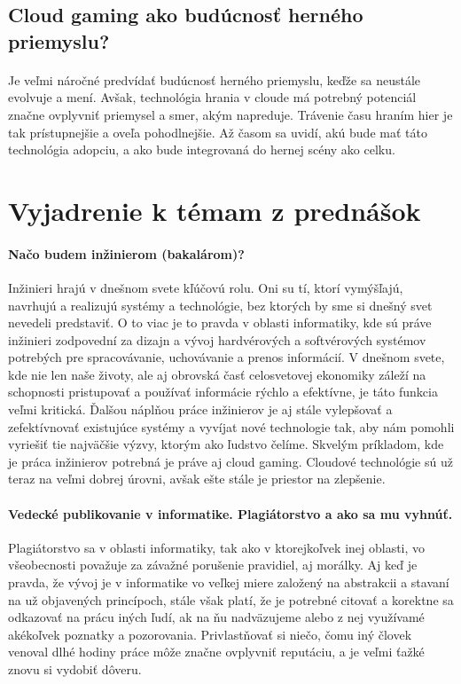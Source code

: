 \documentclass[10pt,twoside,slovak,a4paper]{article}
\begin{document}
\subsection{Cloud gaming ako budúcnosť herného priemyslu?}

\paragraph{} Je veľmi náročné predvídať budúcnosť herného priemyslu, keďže sa neustále evolvuje a mení. Avšak, technológia hrania v cloude má potrebný potenciál značne ovplyvniť priemysel a smer, akým napreduje. Trávenie času hraním hier je tak prístupnejšie a oveľa pohodlnejšie. Až časom sa uvidí, akú bude mať táto technológia adopciu, a ako bude integrovaná do hernej scény ako celku. \cite{7182690}



\section{Vyjadrenie k témam z prednášok}

\paragraph{Načo budem inžinierom (bakalárom)?} Inžinieri hrajú v dnešnom svete kľúčovú rolu. Oni su tí, ktorí vymýšľajú, navrhujú a realizujú systémy a technológie, bez ktorých by sme si dnešný svet nevedeli predstaviť. O to viac je to pravda v oblasti informatiky, kde sú práve inžinieri zodpovední za dizajn a vývoj hardvérových a softvérových systémov potrebých pre spracovávanie, uchovávanie a prenos informácií. V dnešnom svete, kde nie len naše životy, ale aj obrovská časť celosvetovej ekonomiky záleží na schopnosti pristupovať a používať informácie rýchlo a efektívne, je táto funkcia veľmi kritická. Ďalšou náplňou práce inžinierov je aj stále vylepšovať a zefektívnovať existujúce systémy a vyvíjat nové technologie tak, aby nám pomohli vyriešiť tie najväčšie výzvy, ktorým ako ľudstvo čelíme. Skvelým príkladom, kde je práca inžinierov potrebná je práve aj cloud gaming. Cloudové technológie sú už teraz na veľmi dobrej úrovni, avšak ešte stále je priestor na zlepšenie.

\paragraph{Vedecké publikovanie v informatike. Plagiátorstvo a ako sa mu vyhnúť.} Plagiátorstvo sa v oblasti informatiky, tak ako v ktorejkoľvek inej oblasti, vo všeobecnosti považuje za závažné porušenie pravidiel, aj morálky. Aj keď je pravda, že vývoj je v informatike vo veľkej miere založený na abstrakcii a stavaní na už objavených princípoch, stále však platí, že je potrebné citovať a korektne sa odkazovať na prácu iných ľudí, ak na ňu nadväzujeme alebo z nej využívamé akékoľvek poznatky a pozorovania. Privlastňovať si niečo, čomu iný človek venoval dlhé hodiny práce môže značne ovplyvniť reputáciu, a je veľmi ťažké znovu si vydobiť dôveru.
\end{document}
